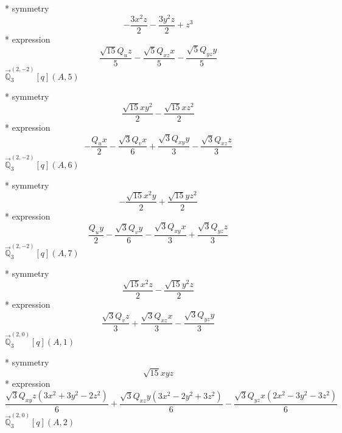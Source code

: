 \documentclass[fleqn,8pt]{jsarticle}
\begin{document}
\noindent\quad ** symmetry
\begin{dmath*}
- \frac{3 x^{2} z}{2} - \frac{3 y^{2} z}{2} + z^{3}
\end{dmath*}
\noindent\quad ** expression
\begin{dmath*}
\frac{\sqrt{15} Q_{u} z}{5} - \frac{\sqrt{5} Q_{xz} x}{5} - \frac{\sqrt{5} Q_{yz} y}{5}
\end{dmath*}
\noindent\quad $\vec{\mathbb{Q}}_{3}^{(2,-2)}[q](A,5)$

\noindent\quad ** symmetry
\begin{dmath*}
\frac{\sqrt{15} x y^{2}}{2} - \frac{\sqrt{15} x z^{2}}{2}
\end{dmath*}
\noindent\quad ** expression
\begin{dmath*}
- \frac{Q_{u} x}{2} - \frac{\sqrt{3} Q_{v} x}{6} + \frac{\sqrt{3} Q_{xy} y}{3} - \frac{\sqrt{3} Q_{xz} z}{3}
\end{dmath*}
\noindent\quad $\vec{\mathbb{Q}}_{3}^{(2,-2)}[q](A,6)$

\noindent\quad ** symmetry
\begin{dmath*}
- \frac{\sqrt{15} x^{2} y}{2} + \frac{\sqrt{15} y z^{2}}{2}
\end{dmath*}
\noindent\quad ** expression
\begin{dmath*}
\frac{Q_{u} y}{2} - \frac{\sqrt{3} Q_{v} y}{6} - \frac{\sqrt{3} Q_{xy} x}{3} + \frac{\sqrt{3} Q_{yz} z}{3}
\end{dmath*}
\noindent\quad $\vec{\mathbb{Q}}_{3}^{(2,-2)}[q](A,7)$

\noindent\quad ** symmetry
\begin{dmath*}
\frac{\sqrt{15} x^{2} z}{2} - \frac{\sqrt{15} y^{2} z}{2}
\end{dmath*}
\noindent\quad ** expression
\begin{dmath*}
\frac{\sqrt{3} Q_{v} z}{3} + \frac{\sqrt{3} Q_{xz} x}{3} - \frac{\sqrt{3} Q_{yz} y}{3}
\end{dmath*}
\noindent\quad $\vec{\mathbb{Q}}_{3}^{(2,0)}[q](A,1)$

\noindent\quad ** symmetry
\begin{dmath*}
\sqrt{15} x y z
\end{dmath*}
\noindent\quad ** expression
\begin{dmath*}
\frac{\sqrt{3} Q_{xy} z \left(3 x^{2} + 3 y^{2} - 2 z^{2}\right)}{6} + \frac{\sqrt{3} Q_{xz} y \left(3 x^{2} - 2 y^{2} + 3 z^{2}\right)}{6} - \frac{\sqrt{3} Q_{yz} x \left(2 x^{2} - 3 y^{2} - 3 z^{2}\right)}{6}
\end{dmath*}
\noindent\quad $\vec{\mathbb{Q}}_{3}^{(2,0)}[q](A,2)$
\end{document}
